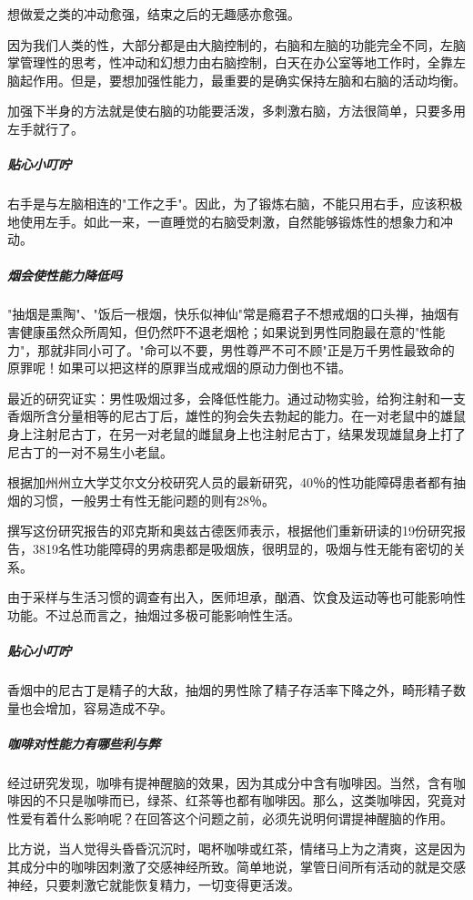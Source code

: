 想做爱之类的冲动愈强，结束之后的无趣感亦愈强。

因为我们人类的性，大部分都是由大脑控制的，右脑和左脑的功能完全不同，左脑掌管理性的思考，性冲动和幻想力由右脑控制，白天在办公室等地工作时，全靠左脑起作用。但是，要想加强性能力，最重要的是确实保持左脑和右脑的活动均衡。

加强下半身的方法就是使右脑的功能要活泼，多刺激右脑，方法很简单，只要多用左手就行了。

\subparagraph{贴心小叮咛}

右手是与左脑相连的"工作之手"。因此，为了锻炼右脑，不能只用右手，应该积极地使用左手。如此一来，一直睡觉的右脑受刺激，自然能够锻炼性的想象力和冲动。

\subparagraph{烟会使性能力降低吗}

"抽烟是熏陶"、"饭后一根烟，快乐似神仙"常是瘾君子不想戒烟的口头禅，抽烟有害健康虽然众所周知，但仍然吓不退老烟枪；如果说到男性同胞最在意的"性能力"，那就非同小可了。"命可以不要，男性尊严不可不顾"正是万千男性最致命的原罪呢！如果可以把这样的原罪当成戒烟的原动力倒也不错。

最近的研究证实：男性吸烟过多，会降低性能力。通过动物实验，给狗注射和一支香烟所含分量相等的尼古丁后，雄性的狗会失去勃起的能力。在一对老鼠中的雄鼠身上注射尼古丁，在另一对老鼠的雌鼠身上也注射尼古丁，结果发现雄鼠身上打了尼古丁的一对不易生小老鼠。

根据加州州立大学艾尔文分校研究人员的最新研究，40％的性功能障碍患者都有抽烟的习惯，一般男士有性无能问题的则有28％。

撰写这份研究报告的邓克斯和奥兹古德医师表示，根据他们重新研读的19份研究报告，3819名性功能障碍的男病患都是吸烟族，很明显的，吸烟与性无能有密切的关系。

由于采样与生活习惯的调查有出入，医师坦承，酗酒、饮食及运动等也可能影响性功能。不过总而言之，抽烟过多极可能影响性生活。

\subparagraph{贴心小叮咛}

香烟中的尼古丁是精子的大敌，抽烟的男性除了精子存活率下降之外，畸形精子数量也会增加，容易造成不孕。

\subparagraph{咖啡对性能力有哪些利与弊}

经过研究发现，咖啡有提神醒脑的效果，因为其成分中含有咖啡因。当然，含有咖啡因的不只是咖啡而已，绿茶、红茶等也都有咖啡因。那么，这类咖啡因，究竟对性爱有着什么影响呢？在回答这个问题之前，必须先说明何谓提神醒脑的作用。

比方说，当人觉得头昏昏沉沉时，喝杯咖啡或红茶，情绪马上为之清爽，这是因为其成分中的咖啡因刺激了交感神经所致。简单地说，掌管日间所有活动的就是交感神经，只要刺激它就能恢复精力，一切变得更活泼。


